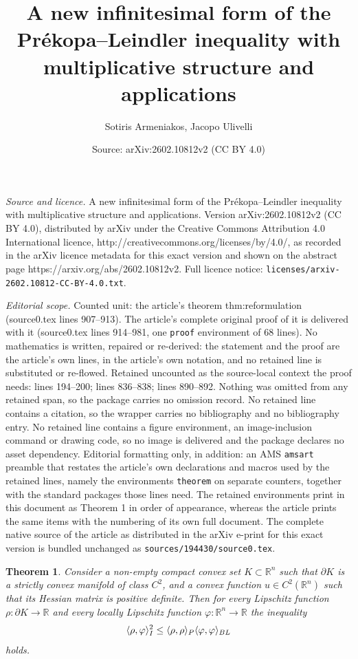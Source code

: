 \documentclass[10pt,a4paper]{amsart}
\title{A new infinitesimal form of the Pr\'ekopa--Leindler inequality with multiplicative structure and applications}
\author{Sotiris Armeniakos, Jacopo Ulivelli}
\date{Source: arXiv:2602.10812v2 (CC BY 4.0)}
\newtheorem{theorem}{Theorem}
\newcommand{\R}{\mathbb{R}}
\begin{document}
\maketitle

\noindent\emph{Source and licence.} A new infinitesimal form of the Pr\'ekopa--Leindler inequality with multiplicative structure and applications. Version arXiv:2602.10812v2 (CC BY 4.0), distributed by arXiv under the Creative Commons Attribution 4.0 International licence, http://creativecommons.org/licenses/by/4.0/, as recorded in the arXiv licence metadata for this exact version and shown on the abstract page https://arxiv.org/abs/2602.10812v2. Full licence notice: \texttt{licenses/arxiv-2602.10812-CC-BY-4.0.txt}.\par\smallskip

\noindent\textit{Editorial scope.} Counted unit: the article's theorem thm:reformulation (source0.tex lines 907--913). The article's complete original proof of it is delivered with it (source0.tex lines 914--981, one \texttt{proof} environment of 68 lines). No mathematics is written, repaired or re-derived: the statement and the proof are the article's own lines, in the article's own notation, and no retained line is substituted or re-flowed.  Retained uncounted as the source-local context the proof needs: lines 194--200; lines 836--838; lines 890--892.  Nothing was omitted from any retained span, so the package carries no omission record.  No retained line contains a citation, so the wrapper carries no bibliography and no bibliography entry.  No retained line contains a figure environment, an image-inclusion command or drawing code, so no image is delivered and the package declares no asset dependency.  Editorial formatting only, in addition: an AMS \texttt{amsart} preamble that restates the article's own declarations and macros used by the retained lines, namely the environments \texttt{theorem} on separate counters, together with the standard packages those lines need.  The retained environments print in this document as Theorem 1 in order of appearance, whereas the article prints the same items with the numbering of its own full document.  The complete native source of the article as distributed in the arXiv e-print for this exact version is bundled unchanged as \texttt{sources/194430/source0.tex}.
\begin{theorem}\label{thm:multiplicative_form}
    Consider a non-empty compact convex set $K \subset \R^n$ such that $\partial K$ is a strictly convex manifold of class $C^2$, and a convex function $u \in C^2(\R^n)$ such that its Hessian matrix is positive definite. Then for every Lipschitz function $\rho: \partial K \to \R$ and every locally Lipschitz function $\varphi: \R^n \to \R$ the inequality 
    \begin{equation}\label{eq:multiplicative_form}
        \langle \rho, \varphi \rangle_{\rm I}^2 \leq \langle \rho, \rho \rangle_{\rm P} \langle \varphi, \varphi \rangle_{\rm BL}
    \end{equation}
    holds.
\end{theorem}
\end{document}
